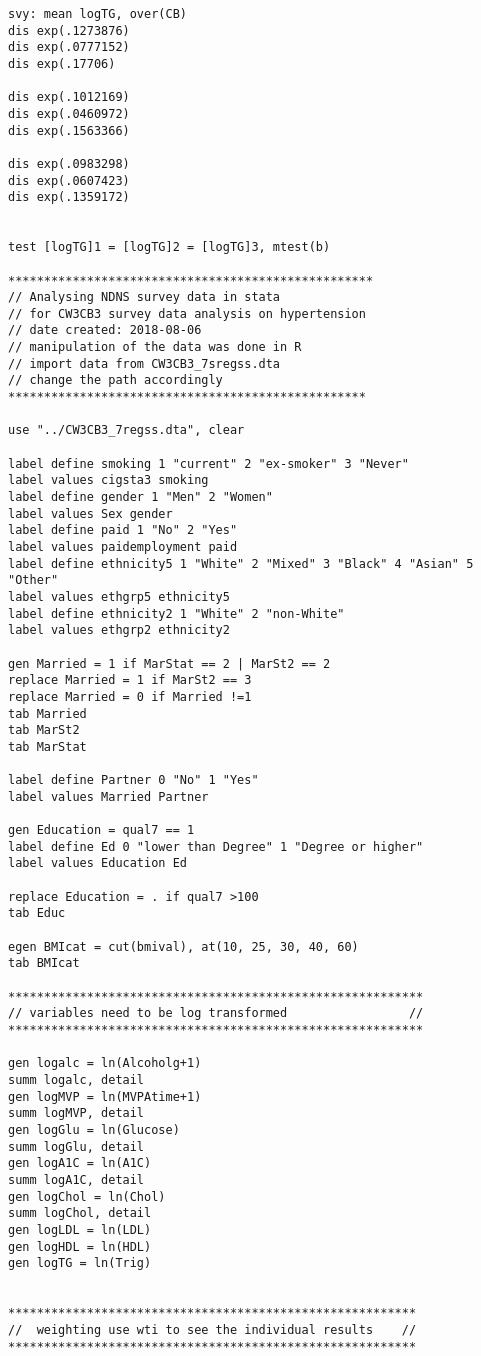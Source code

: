 \begin{verbatim}
svy: mean logTG, over(CB)
dis exp(.1273876)
dis exp(.0777152)
dis exp(.17706)

dis exp(.1012169)  
dis exp(.0460972)
dis exp(.1563366)

dis exp(.0983298)
dis exp(.0607423)
dis exp(.1359172)


test [logTG]1 = [logTG]2 = [logTG]3, mtest(b)

***************************************************
// Analysing NDNS survey data in stata
// for CW3CB3 survey data analysis on hypertension
// date created: 2018-08-06
// manipulation of the data was done in R
// import data from CW3CB3_7sregss.dta
// change the path accordingly
**************************************************

use "../CW3CB3_7regss.dta", clear

label define smoking 1 "current" 2 "ex-smoker" 3 "Never"
label values cigsta3 smoking
label define gender 1 "Men" 2 "Women"
label values Sex gender
label define paid 1 "No" 2 "Yes"
label values paidemployment paid
label define ethnicity5 1 "White" 2 "Mixed" 3 "Black" 4 "Asian" 5 "Other"
label values ethgrp5 ethnicity5
label define ethnicity2 1 "White" 2 "non-White"
label values ethgrp2 ethnicity2

gen Married = 1 if MarStat == 2 | MarSt2 == 2 
replace Married = 1 if MarSt2 == 3
replace Married = 0 if Married !=1
tab Married
tab MarSt2
tab MarStat

label define Partner 0 "No" 1 "Yes"
label values Married Partner

gen Education = qual7 == 1
label define Ed 0 "lower than Degree" 1 "Degree or higher"
label values Education Ed

replace Education = . if qual7 >100
tab Educ

egen BMIcat = cut(bmival), at(10, 25, 30, 40, 60)
tab BMIcat

**********************************************************
// variables need to be log transformed                 //
**********************************************************

gen logalc = ln(Alcoholg+1)
summ logalc, detail
gen logMVP = ln(MVPAtime+1)
summ logMVP, detail
gen logGlu = ln(Glucose)
summ logGlu, detail
gen logA1C = ln(A1C)
summ logA1C, detail
gen logChol = ln(Chol)
summ logChol, detail
gen logLDL = ln(LDL)
gen logHDL = ln(HDL)
gen logTG = ln(Trig)


*********************************************************
//  weighting use wti to see the individual results    //
*********************************************************



\end{verbatim}
